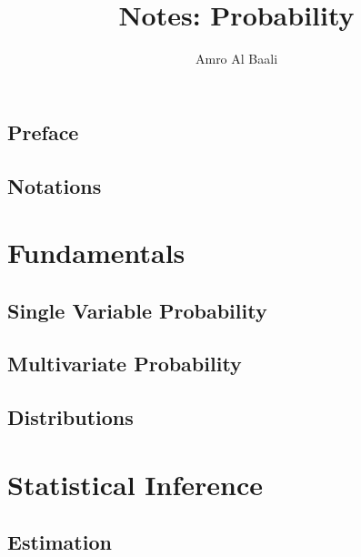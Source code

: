 \documentclass{Templates/amro-notes}
\title{Notes: Probability}
\author{{Amro Al Baali}}
\date{\daterange}
\begin{document}
\maketitle
\tableofcontents
{} 


\chapter*{Preface}


\clearpage
\chapter*{Notations}


\clearpage
{} 
\part{Fundamentals}
\chapter{Single Variable Probability}


\clearpage
\chapter{Multivariate Probability}


\clearpage
\chapter{Distributions}


\clearpage
\part{Statistical Inference}

% 

\chapter{Estimation}



\begin{appendices}
    
\end{appendices}
{}

\end{document}
